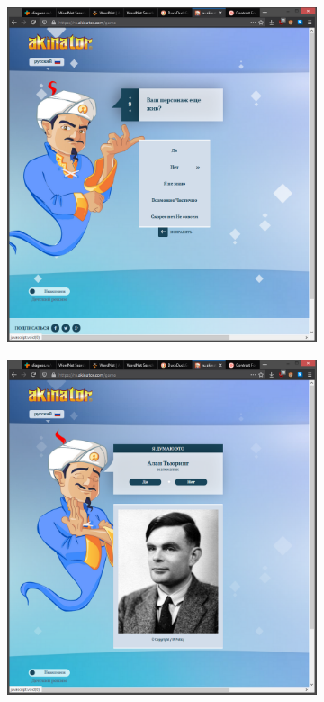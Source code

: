 \documentclass[
  a4paper,
  oneside,
  BCOR = 10mm,
  DIV = 12,
  12pt,
  headings = normal,
]{scrartcl}
\newlength{\gridunitwidth}
\begin{document}
\begin{figure}[!htbp]
\begin{subfigure}[b]{6 \gridunitwidth - 1em /2}
          \caption{}
          \label{subfig:akinator-02}
        \end{subfigure}
        \begin{subfigure}[b]{6 \gridunitwidth - 1em /2}
          \includegraphics[width = \columnwidth]{./assets/14.png}
          \caption{}
          \label{subfig:akinator-03}
        \end{subfigure}%
        \hspace{1em}%
        \begin{subfigure}[b]{6 \gridunitwidth - 1em /2}
          \includegraphics[width = \columnwidth]{./assets/15.png}

\end{subfigure}
\end{figure}
\end{document}
